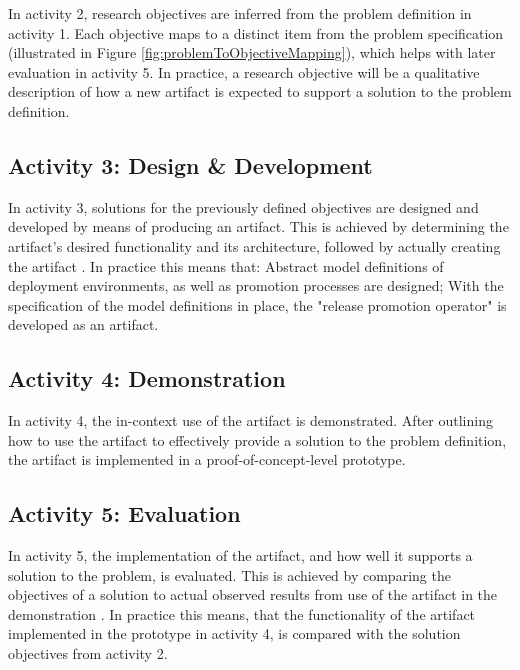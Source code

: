 \noindent
In activity 2,
research objectives are inferred from the problem definition in activity 1.
Each objective maps to a distinct item from the problem specification
(illustrated in Figure \ref{fig:problemToObjectiveMapping}),
which helps with later evaluation in activity 5.
In practice, a research objective will be a qualitative description of
how a new artifact is expected to support a solution to the problem definition.
\bigskip

\subsection{Activity 3: Design \& Development}
\label{methodology:activity3}

\noindent
In activity 3,
solutions for the previously defined objectives are designed and developed
by means of producing an artifact.
This is achieved by
determining the artifact's desired functionality and its architecture,
followed by actually creating the artifact
\autocite{designScienceResearchMethodologyForInformationSystemsResearch}.
In practice this means that:
Abstract model definitions of deployment environments, as well as
promotion processes are designed;
With the specification of the model definitions in place,
the "release promotion operator" is developed as an artifact.
\bigskip

\subsection{Activity 4: Demonstration}
\label{methodology:activity4}

\noindent
In activity 4,
the in-context use of the artifact is demonstrated.
After outlining how to use the artifact to effectively provide a solution to the problem definition,
the artifact is implemented in a proof-of-concept-level prototype.
\bigskip

\subsection{Activity 5: Evaluation}
\label{methodology:activity5}

\noindent
In activity 5,
the implementation of the artifact,
and how well it supports a solution to the problem,
is evaluated.
This is achieved by
comparing the objectives of a solution to actual observed results
from use of the artifact in the demonstration
\autocite{designScienceResearchMethodologyForInformationSystemsResearch}.
In practice this means, that
the functionality of the artifact implemented in the prototype in activity 4,
is compared with the solution objectives from activity 2.
\bigskip

